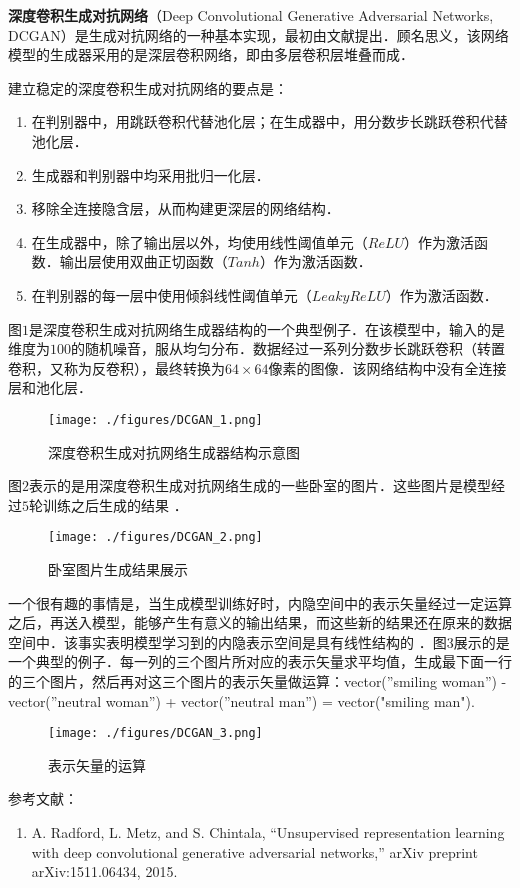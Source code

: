 
\textbf{深度卷积生成对抗网络}（Deep Convolutional Generative Adversarial Networks, DCGAN）是生成对抗网络的一种基本实现，最初由文献\cite{DCGAN}提出．顾名思义，该网络模型的生成器采用的是深层卷积网络，即由多层卷积层堆叠而成．

建立稳定的深度卷积生成对抗网络的要点是\cite{DCGAN}：
\begin{enumerate}
\item 在判别器中，用跳跃卷积代替池化层；在生成器中，用分数步长跳跃卷积代替池化层．
\item 生成器和判别器中均采用批归一化层．
\item 移除全连接隐含层，从而构建更深层的网络结构．
\item 在生成器中，除了输出层以外，均使用线性阈值单元（$ReLU$）作为激活函数．输出层使用双曲正切函数（$Tanh$）作为激活函数．
\item 在判别器的每一层中使用倾斜线性阈值单元（$Leaky ReLU$）作为激活函数．
\end{enumerate}

图$1$是深度卷积生成对抗网络生成器结构的一个典型例子．在该模型中，输入的是维度为$100$的随机噪音，服从均匀分布．数据经过一系列分数步长跳跃卷积（转置卷积，又称为反卷积），最终转换为$64 \times64$像素的图像．该网络结构中没有全连接层和池化层．
\begin{figure}[ht]
\centering
\texttt{[image: ./figures/DCGAN\_1.png]}
\caption{深度卷积生成对抗网络生成器结构示意图 \cite{DCGAN}} \label{DCGAN_fig1}
\end{figure}

图$2$表示的是用深度卷积生成对抗网络生成的一些卧室的图片．这些图片是模型经过$5$轮训练之后生成的结果 \cite{DCGAN}．
\begin{figure}[ht]
\centering
\texttt{[image: ./figures/DCGAN\_2.png]}
\caption{卧室图片生成结果展示} \label{DCGAN_fig2}
\end{figure}

一个很有趣的事情是，当生成模型训练好时，内隐空间中的表示矢量经过一定运算之后，再送入模型，能够产生有意义的输出结果，而这些新的结果还在原来的数据空间中．该事实表明模型学习到的内隐表示空间是具有线性结构的 \cite{DCGAN}．图$3$展示的是一个典型的例子．每一列的三个图片所对应的表示矢量求平均值，生成最下面一行的三个图片，然后再对这三个图片的表示矢量做运算：vector(”smiling woman”) - vector(”neutral woman”) + vector(”neutral man”) = vector("smiling man").

\begin{figure}[ht]
\centering
\texttt{[image: ./figures/DCGAN\_3.png]}
\caption{表示矢量的运算} \label{DCGAN_fig3}
\end{figure}




参考文献：
\begin{enumerate}
\item A. Radford, L. Metz, and S. Chintala, “Unsupervised representation learning with deep convolutional generative adversarial networks,” arXiv preprint arXiv:1511.06434, 2015.
\end{enumerate}